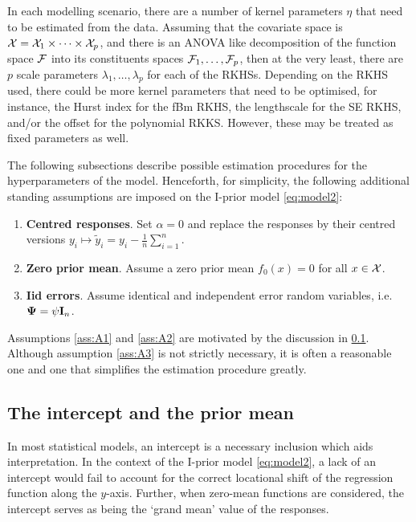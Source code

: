 In each modelling scenario, there are a number of kernel parameters $\eta$ that need to be estimated from the data.
Assuming that the covariate space is ${\mathcal X} = {\mathcal X}_1\times\cdots\times{\mathcal X}_p$, and there is an ANOVA like decomposition of the function space ${\mathcal F}$ into its constituents spaces ${\mathcal F}_1,\dots,{\mathcal F}_p$, then at the very least, there are $p$ scale parameters $\lambda_1,\dots,\lambda_p$ for each of the RKHSs.
Depending on the RKHS used, there could be more kernel parameters that need to be optimised, for instance, the Hurst index for the fBm RKHS, the lengthscale for the SE RKHS, and/or the offset for the polynomial RKKS.
However, these may be treated as fixed parameters as well.

The following subsections describe possible estimation procedures for the hyperparameters of the model.
Henceforth, for simplicity, the following additional standing assumptions are imposed on the I-prior model \cref{eq:model2}:
\begin{enumerate}[label=A\arabic*,ref=A\arabic*]
  \item \textbf{Centred responses}. Set $\alpha = 0$ and replace the responses by their centred versions $y_i \mapsto \tilde y_i = y_i - \frac{1}{n}\sum_{i=1}^n$. \label{ass:A1}  
  \item \textbf{Zero prior mean}. Assume a zero prior mean $f_0(x) = 0$ for all $x\in{\mathcal X}$. \label{ass:A2} 
  \item \textbf{Iid errors}. Assume identical and independent error random variables, i.e. ${\bm\Psi} = \psi{\mathbf I}_n$. \label{ass:A3} 
\end{enumerate}
Assumptions \ref{ass:A1} and \ref{ass:A2} are motivated by the discussion in \cref{sec:intercept}.
Although assumption \ref{ass:A3} is not strictly necessary, it is often a reasonable one and one that simplifies the estimation procedure greatly.

\vspace{-0.25em}
\subsection{The intercept and the prior mean}\label{sec:intercept}
\vspace{-0.25em}
In most statistical models, an intercept is a necessary inclusion which aids interpretation.
In the context of the I-prior model \cref{eq:model2}, a lack of an intercept would fail to account for the correct locational shift of the regression function along the $y$-axis.
Further, when zero-mean functions are considered, the intercept serves as being the `grand mean' value of the responses.

